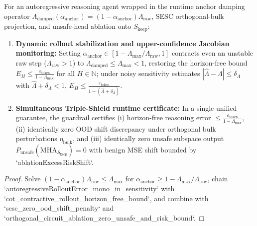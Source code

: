 \begin{lemma}\label{lem:runtime_reasoning_guardrail}
\leanok
{}
For an autoregressive reasoning agent wrapped in the runtime anchor damping operator $\Lambda_{\mathrm{damped}}(\alpha_{\mathrm{anchor}}) = (1 - \alpha_{\mathrm{anchor}})\Lambda_{\mathrm{raw}}$, $\mathrm{SESC}$ orthogonal-bulk projection, and unsafe-head ablation onto $S_{\mathrm{keep}}$:
\begin{enumerate}
\item \textbf{Dynamic rollout stabilization and upper-confidence Jacobian monitoring:} Setting $\alpha_{\mathrm{anchor}} \in [1 - \Lambda_{\max}/\Lambda_{\mathrm{raw}}, 1]$ contracts even an unstable raw step ($\Lambda_{\mathrm{raw}} > 1$) to $\Lambda_{\mathrm{damped}} \le \Lambda_{\max} < 1$, restoring the horizon-free bound $E_H \le \frac{\varepsilon_{\mathrm{token}}}{1 - \Lambda_{\max}}$ for all $H \in \mathbb{N}$; under noisy sensitivity estimates $|\hat{\Lambda} - \Lambda| \le \delta_\Lambda$ with $\hat{\Lambda} + \delta_\Lambda < 1$, $E_H \le \frac{\varepsilon_{\mathrm{token}}}{1 - (\hat{\Lambda} + \delta_\Lambda)}$.
\item \textbf{Simultaneous Triple-Shield runtime certificate:} In a single unified guarantee, the guardrail certifies (i) horizon-free reasoning error $\le \frac{\varepsilon_{\mathrm{token}}}{1-\Lambda_{\max}}$, (ii) identically zero OOD shift discrepancy under orthogonal bulk perturbations $\eta_{\mathrm{bulk}}$, and (iii) identically zero unsafe subspace output $P_{\mathrm{unsafe}}(\mathrm{MHA}_{S_{\mathrm{keep}}}) = 0$ with benign MSE shift bounded by `ablationExcessRiskShift`.
\end{enumerate}
\end{lemma}
\begin{proof}
\leanok
Solve $(1 - \alpha_{\mathrm{anchor}})\Lambda_{\mathrm{raw}} \le \Lambda_{\max}$ for $\alpha_{\mathrm{anchor}} \ge 1 - \Lambda_{\max}/\Lambda_{\mathrm{raw}}$, chain `autoregressiveRolloutError_mono_in_sensitivity` with `cot_contractive_rollout_horizon_free_bound`, and combine with `sesc_zero_ood_shift_penalty` and `orthogonal_circuit_ablation_zero_unsafe_and_risk_bound`.
\end{proof}

